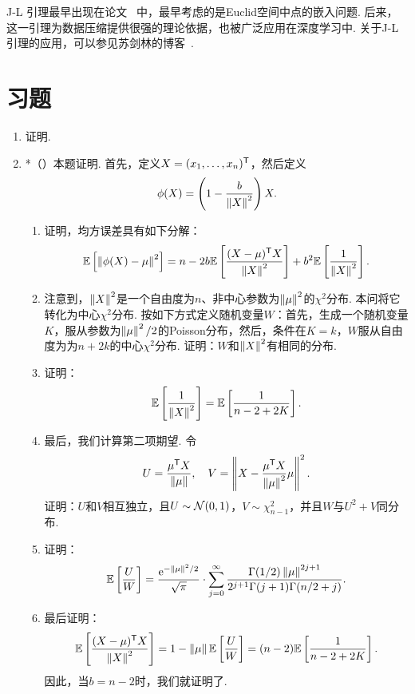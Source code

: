 \begin{remark}
    J-L 引理最早出现在论文~\cite{johnsonExtensionsLipschitzMappings1984} 中，最早考虑的是Euclid空间中点的嵌入问题. 后来，这一引理为数据压缩提供很强的理论依据，也被广泛应用在深度学习中. 关于J-L引理的应用，可以参见苏剑林的博客~\cite{SuJianLinZuiXiaoShangYuanLiLiuCiXiangLiangDeWeiDuYingGaiZenMeXuanZe,SuJianLinRangRenLiangTanDeJohnsonLindenstraussYinLiYingYongPian,SuJianLinRangRenLiangTanDeJohnsonLindenstraussYinLiLiLunPian}.
\end{remark}

\section{习题}

\begin{enumerate}[wide,labelindent=0pt]
    \item \label{exercise:volume-surface-area} 证明. 
    \item *\label{exercise:stein-paradox}（\cite{jamesEstimationQuadraticLoss1961}）本题证明. 首先，定义$X=(x_1,\dots,x_n)^{\mathsf{T}}$，然后定义
    \[\phi(X)=\left(1-\frac{b}{\left\|X\right\|^2}\right)X.\]
    \begin{enumerate}
        \item 证明，均方误差具有如下分解：
        \[\mathbb{E}\left[\left\|\phi(X)-\mu\right\|^2\right]=n-2b\mathbb{E}\left[\frac{(X-\mu)^{\mathsf{T}} X}{\left\|X\right\|^2}\right]+b^2\mathbb{E}\left[\frac{1}{\left\|X\right\|^2}\right].\]
        \item 注意到，$\left\|X\right\|^2$是一个自由度为$n$、非中心参数为$\left\|\mu\right\|^2$的$\chi^2$分布. 本问将它转化为中心$\chi^2$分布. 按如下方式定义随机变量$W$：首先，生成一个随机变量$K$，服从参数为$\left\|\mu\right\|^2/2$的Poisson分布，然后，条件在$K=k$，$W$服从自由度为为$n+2k$的中心$\chi^2$分布. 证明：$W$和$\left\|X\right\|^2$有相同的分布. 
        \item 证明：
        \[\mathbb{E}\left[\frac{1}{\left\|X\right\|^2}\right]=\mathbb{E}\left[\frac{1}{n-2+2K}\right].\]
        \item 最后，我们计算第二项期望. 令
        \[U=\frac{\mu^{\mathsf{T}} X}{\left\|\mu\right\|},\quad V=\left\|X-\frac{\mu^{\mathsf{T}} X}{\left\|\mu\right\|^2}\mu\right\|^2.\]
        证明：$U$和$V$相互独立，且$U\sim\mathcal{N}(0,1)$，$V\sim\chi_{n-1}^2$，并且$W$与$U^2+V$同分布. 
        \item 证明：
        \[\mathbb{E}\left[\frac{U}{W}\right]=\frac{\mathrm{e}^{-\left\|\mu\right\|^2/2}}{\sqrt{\pi}}\cdot\sum_{j=0}^\infty\frac{\Gamma(1/2)\left\|\mu\right\|^{2j+1}}{2^{j+1}\Gamma(j+1)\Gamma(n/2+j)}.\]
        \item 最后证明：
        \[\mathbb{E}\left[\frac{(X-\mu)^{\mathsf{T}} X}{\left\|X\right\|^2}\right]=1-\left\|\mu\right\|\mathbb{E}\left[\frac{U}{W}\right]=(n-2)\mathbb{E}\left[\frac{1}{n-2+2K}\right].\]
        因此，当$b=n-2$时，我们就证明了.
    \end{enumerate}


\end{enumerate}
